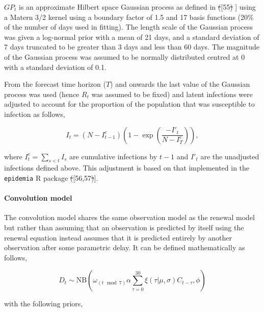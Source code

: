 \documentclass[10pt,letterpaper]{article} %
\providecommand{\DIFdeltex}[1]{{\protect\color{red}\sout{#1}}}                      %
\providecommand{\DIFaddbegin}{} %
\providecommand{\DIFaddend}{} %
\providecommand{\DIFdelbegin}{} %
\providecommand{\DIFdelend}{} %
\providecommand{\DIFdel}[1]{\texorpdfstring{\DIFdeltex{#1}}{}} %
\newcommand{\DIFscaledelfig}{0.5}
\newlength{\DIFdelgraphicswidth} %
\newlength{\DIFdelgraphicsheight} %
\newcommand{\DIFaddincludegraphics}[2][]{{\color{blue}\fbox{\DIFOincludegraphics[#1]{#2}}}} %
\newcommand{\DIFdelincludegraphics}[2][]{%
\sbox{\DIFdelgraphicsbox}{\DIFOincludegraphics[#1]{#2}}%
\settoboxwidth{\DIFdelgraphicswidth}{\DIFdelgraphicsbox} %
\settoboxtotalheight{\DIFdelgraphicsheight}{\DIFdelgraphicsbox} %
\scalebox{\DIFscaledelfig}{%
\parbox[b]{\DIFdelgraphicswidth}{\usebox{\DIFdelgraphicsbox}\\[-\baselineskip] \rule{\DIFdelgraphicswidth}{0em}}\llap{\resizebox{\DIFdelgraphicswidth}{\DIFdelgraphicsheight}{%
\setlength{\unitlength}{\DIFdelgraphicswidth}%
\begin{picture}(1,1)%
\thicklines\linethickness{2pt} %
{\color[rgb]{1,0,0}\put(0,0){\framebox(1,1){}}}%
{\color[rgb]{1,0,0}\put(0,0){\line( 1,1){1}}}%
{\color[rgb]{1,0,0}\put(0,1){\line(1,-1){1}}}%
\end{picture}%
}\hspace*{3pt}}} %
} %
\DeclareRobustCommand{\DIFaddbegin}{\DIFOaddbegin \let\includegraphics\DIFaddincludegraphics} %
\DeclareRobustCommand{\DIFaddend}{\DIFOaddend \let\includegraphics\DIFOincludegraphics} %
\DeclareRobustCommand{\DIFdelbegin}{\DIFOdelbegin \let\includegraphics\DIFdelincludegraphics} %
\DeclareRobustCommand{\DIFdelend}{\DIFOaddend \let\includegraphics\DIFOincludegraphics} %
\begin{document}
\(GP_t\) is an approximate Hilbert space Gaussian process as defined in
\DIFdelbegin \DIFdel{(}\DIFdelend \DIFaddbegin {[}\DIFaddend 55\DIFdelbegin \DIFdel{) }\DIFdelend \DIFaddbegin {]} \DIFaddend using a Matern 3/2 kernel using a boundary factor of 1.5 and 17
basis functions (20\% of the number of days used in fitting). The length
scale of the Gaussian process was given a log-normal prior with a mean
of 21 days, and a standard deviation of 7 days truncated to be greater
than 3 days and less than 60 days. The magnitude of the Gaussian process
was assumed to be normally distributed centred at 0 with a standard
deviation of 0.1.

From the forecast time horizon (\(T\)) and onwards the last value of the
Gaussian process was used (hence \(R_t\) was assumed to be fixed) and
latent infections were adjusted to account for the proportion of the
population that was susceptible to infection as follows,

\begin{equation}
    I_t = (N - I^c_{t-1}) \left(1 - \exp \left(\frac{-I'_t}{N - I^c_{T}}\right)\right),
\end{equation}

where \(I^c_t = \sum_{s< t} I_s\) are cumulative infections by \(t-1\)
and \(I'_t\) are the unadjusted infections defined above. This
adjustment is based on that implemented in the \texttt{epidemia} R
package \DIFdelbegin \DIFdel{(}\DIFdelend \DIFaddbegin {[}\DIFaddend 56,57\DIFdelbegin \DIFdel{)}\DIFdelend \DIFaddbegin {]}\DIFaddend .

\hypertarget{convolution-model}{%
\paragraph{Convolution model}\label{convolution-model}}

The convolution model shares the same observation model as the renewal
model but rather than assuming that an observation is predicted by
itself using the renewal equation instead assumes that it is predicted
entirely by another observation after some parametric delay. It can be
defined mathematically as follows,

\begin{equation} 
    D_{t} \sim \mathrm{NB}\left(\omega_{(t \mod 7)} \alpha \sum_{\tau = 0}^{30} \xi(\tau | \mu, \sigma) C_{t-\tau},  \phi \right)
\end{equation}

with the following priors,
\end{document}
